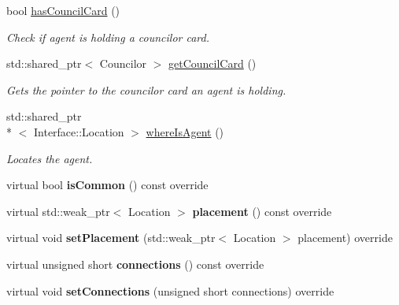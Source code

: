 \begin{DoxyCompactItemize}
bool \hyperlink{class_interface_1_1_agent_a495ab8abaa5db8e949aa03a6e017a919}{has\-Council\-Card} ()
\begin{DoxyCompactList}\small\item\em Check if agent is holding a councilor card. \end{DoxyCompactList}\item 
std\-::shared\-\_\-ptr$<$ Councilor $>$ \hyperlink{class_interface_1_1_agent_ab572b2a6b41aff9681f8ccfe2bf21e98}{get\-Council\-Card} ()
\begin{DoxyCompactList}\small\item\em Gets the pointer to the councilor card an agent is holding. \end{DoxyCompactList}\item 
std\-::shared\-\_\-ptr\\*
$<$ Interface\-::\-Location $>$ \hyperlink{class_interface_1_1_agent_ae660f44754175087bdbf6628bfc54d35}{where\-Is\-Agent} ()
\begin{DoxyCompactList}\small\item\em Locates the agent. \end{DoxyCompactList}\item 
\hypertarget{class_interface_1_1_agent_ac69eaac251e8fbd8ec00e73132cc9456}{virtual bool {\bfseries is\-Common} () const override}\label{class_interface_1_1_agent_ac69eaac251e8fbd8ec00e73132cc9456}

\item 
\hypertarget{class_interface_1_1_agent_a265788497bf9a1bb0a54218d195b0acf}{virtual std\-::weak\-\_\-ptr$<$ Location $>$ {\bfseries placement} () const override}\label{class_interface_1_1_agent_a265788497bf9a1bb0a54218d195b0acf}

\item 
\hypertarget{class_interface_1_1_agent_a992f138d19434cfcda3c5714124fc801}{virtual void {\bfseries set\-Placement} (std\-::weak\-\_\-ptr$<$ Location $>$ placement) override}\label{class_interface_1_1_agent_a992f138d19434cfcda3c5714124fc801}

\item 
\hypertarget{class_interface_1_1_agent_afea820c254c2c41e57581bdeadfeb196}{virtual unsigned short {\bfseries connections} () const override}\label{class_interface_1_1_agent_afea820c254c2c41e57581bdeadfeb196}

\item 
\hypertarget{class_interface_1_1_agent_a86bdf792b301d6df602dec6cda7ae38f}{virtual void {\bfseries set\-Connections} (unsigned short connections) override}\label{class_interface_1_1_agent_a86bdf792b301d6df602dec6cda7ae38f}


\end{DoxyCompactItemize}
